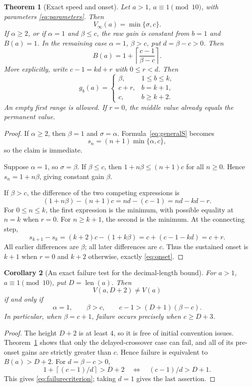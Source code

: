 \documentclass[11pt,a4paper]{article}
\newtheorem{theorem}{Theorem}[section]
\newtheorem{corollary}[theorem]{Corollary}
\theoremstyle{definition}
\theoremstyle{remark}
\newcommand{\len}{\operatorname{len}}
\newcommand{\ceil}[1]{\left\lceil #1\right\rceil}
\begin{document}
\begin{theorem}[Exact speed and onset]\label{thm:onset}
Let $a>1$, $a\equiv1\pmod{10}$, with parameters \eqref{eq:parameters}. Then
\[
 V_\infty(a)=\min\{\sigma,c\}.
\]
If $\alpha\ge2$, or if $\alpha=1$ and $\beta\le c$, the raw gain is constant from $b=1$ and $B(a)=1$.
In the remaining case $\alpha=1$, $\beta>c$, put $d=\beta-c>0$. Then
\begin{equation}\label{eq:onset}
 \boxed{\quad B(a)=1+\ceil{\frac{c-1}{\beta-c}}.\quad}
\end{equation}
More explicitly, write $c-1=kd+r$ with $0\le r<d$. Then
\begin{equation}\label{eq:profile}
 g_b(a)=
 \begin{cases}
 \beta,&1\le b\le k,\\
 c+r,&b=k+1,\\
 c,&b\ge k+2.
 \end{cases}
\end{equation}
An empty first range is allowed. If $r=0$, the middle value already equals the permanent value.
\end{theorem}
\begin{proof}
If $\alpha\ge2$, then $\beta=1$ and $\sigma=\alpha$. Formula~\eqref{eq:generalS} becomes
\[
 s_n=(n+1)\min\{\alpha,c\},
\]
so the claim is immediate.

Suppose $\alpha=1$, so $\sigma=\beta$. If $\beta\le c$, then
$1+n\beta\le(n+1)c$ for all $n\ge0$. Hence $s_n=1+n\beta$, giving constant gain $\beta$.

If $\beta>c$, the difference of the two competing expressions is
\[
 (1+n\beta)-(n+1)c=nd-(c-1)=nd-kd-r.
\]
For $0\le n\le k$, the first expression is the minimum, with possible equality at $n=k$ when $r=0$. For $n\ge k+1$, the second is the minimum. At the connecting step,
\[
 s_{k+1}-s_k
 =(k+2)c-(1+k\beta)
 =c+(c-1-kd)=c+r.
\]
All earlier differences are $\beta$; all later differences are $c$. Thus the sustained onset is $k+1$ when $r=0$ and $k+2$ otherwise, exactly \eqref{eq:onset}.
\end{proof}

\begin{corollary}[An exact failure test for the decimal-length bound]\label{cor:failure}
For $a>1$, $a\equiv1\pmod{10}$, put $D=\len(a)$. Then
\[
 V(a,D+2)\ne V(a)
\]
if and only if
\begin{equation}\label{eq:failurecriterion}
 \alpha=1,\qquad\beta>c,\qquad
 c-1>(D+1)(\beta-c).
\end{equation}
In particular, when $\beta=c+1$, failure occurs precisely when $c\ge D+3$.
\end{corollary}
\begin{proof}
The height $D+2$ is at least $4$, so it is free of initial convention issues. Theorem~\ref{thm:onset} shows that only the delayed-crossover case can fail, and all of its pre-onset gains are strictly greater than $c$.
Hence failure is equivalent to $B(a)>D+2$. For $d=\beta-c>0$,
\[
 1+\ceil{(c-1)/d}>D+2
 \quad\Longleftrightarrow\quad (c-1)/d>D+1.
\]
This gives \eqref{eq:failurecriterion}; taking $d=1$ gives the last assertion.
\end{proof}
\end{document}
